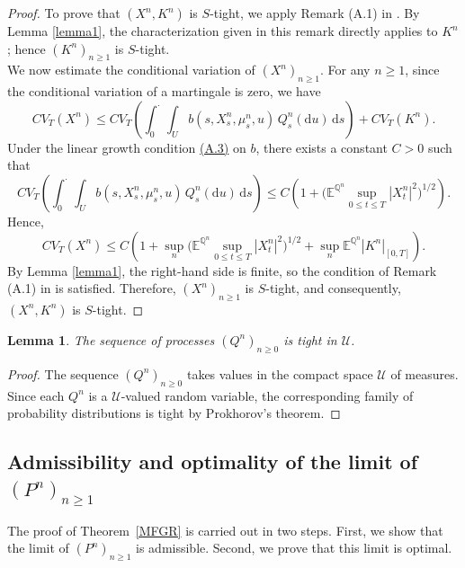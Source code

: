 \documentclass[11pt,amsfonts]{article}
\theoremstyle{plain}
\newtheorem{lemma}{Lemma}
\theoremstyle{assumpstyle}
\numberwithin{equation}{section}
\numberwithin{theorem}{section}
\numberwithin{proposition}{section}
\numberwithin{definition}{section}
\numberwithin{remark}{section}
\numberwithin{corollary}{section}
\numberwithin{lemma}{section}
\begin{document}
\begin{proof}
To prove that $(X^n, K^n)$ is $S$-tight, we apply Remark (A.1) in \cite{Lejay}. 
By Lemma \ref{lemma1}, the characterization given in this remark directly applies to $K^n$; hence $(K^n)_{n\ge1}$ is $S$-tight.\\
We now estimate the conditional variation of $(X^n)_{n\ge1}$. For any $n \ge 1$, since the conditional variation of a martingale is zero, we have
\begin{equation*}
CV_T(X^n) \le CV_T\left(\int_0^{\cdot}\int_U b(s, X^n_s, \mu^n_s, u)\,Q^n_s(\mathrm{d}u)\,\mathrm{d}s\right) + CV_T(K^n).
\end{equation*}
Under the linear growth condition \hyperlink{A.3}{(A.3)} on $b$, there exists a constant $C>0$ such that
\begin{equation*}
CV_T\left(\int_0^{\cdot}\int_U b(s, X^n_s, \mu^n_s, u)\,Q^n_s(\mathrm{d}u)\,\mathrm{d}s\right)
\le C\left(1+\Big(\mathbb{E}^{\mathbb{Q}^n}\sup_{0\le t\le T}|X^n_t|^2\Big)^{1/2}\right).
\end{equation*}
Hence,
\begin{equation*}
CV_T(X^n)
\le C\left(
1+\sup_n \Big(\mathbb{E}^{\mathbb{Q}^n}\sup_{0\le t\le T}|X^n_t|^2\Big)^{1/2}
+\sup_n \mathbb{E}^{\mathbb{Q}^n}|K^n|_{[0,T]}
\right).
\end{equation*}
By Lemma \ref{lemma1}, the right-hand side is finite, so the condition of Remark (A.1) in \cite{Lejay} is satisfied. 
Therefore, $(X^n)_{n\ge1}$ is $S$-tight, and consequently, $(X^n, K^n)$ is $S$-tight.
\end{proof}

\begin{lemma}\label{lemma3}
The sequence of processes $(Q^n)_{n \geq 0}$ is tight in $\mathcal{U}$.
\end{lemma}
\begin{proof}
The sequence $(Q^n)_{n \ge 0}$ takes values in the compact space $\mathcal{U}$ of measures. 
Since each $Q^n$ is a $\mathcal{U}$-valued random variable, the corresponding family of probability distributions is tight by Prokhorov’s theorem.
\end{proof}
\subsection{Admissibility and optimality of the limit of $(P^n)_{n\ge1}$}\label{subsection 4.2}
The proof of Theorem~\ref{MFGR} is carried out in two steps. 
First, we show that the limit of $(P^n)_{n \geq 1}$ is admissible. 
Second, we prove that this limit is optimal.\\
\end{document}
